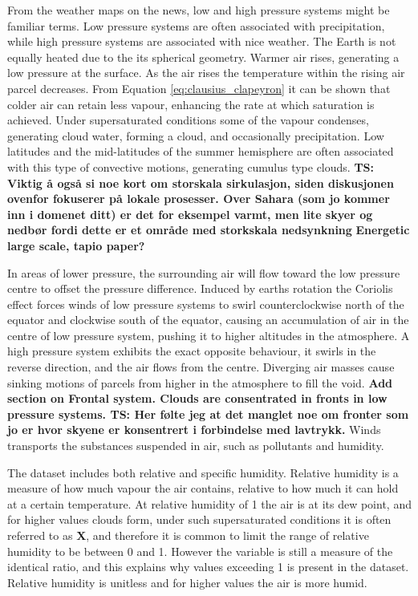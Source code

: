 From the weather maps on the news, low and high pressure systems might be familiar terms. Low pressure systems are often associated with precipitation, while high pressure systems are associated with nice weather. The Earth is not equally heated due to the its spherical geometry. Warmer air rises, generating a low pressure at the surface. As the air rises the temperature within the rising air parcel decreases. From Equation \eqref{eq:clausius_clapeyron} it can be shown that colder air can retain less vapour, enhancing the rate at which saturation is achieved. Under supersaturated conditions some of the vapour condenses, generating cloud water, forming a cloud, and occasionally precipitation. Low latitudes and the mid-latitudes of the summer hemisphere are often associated with this type of convective motions, generating cumulus type clouds. \textbf{TS: Viktig å også si noe kort om storskala sirkulasjon, siden diskusjonen ovenfor fokuserer på lokale prosesser. Over Sahara (som jo kommer inn i domenet ditt) er det for eksempel varmt, men lite skyer og nedbør fordi dette er et område med storkskala nedsynkning}
\textbf{Energetic large scale, tapio paper?}

In areas of lower pressure, the surrounding air will flow toward the low pressure centre to offset the pressure difference. Induced by earths rotation the Coriolis effect forces winds of low pressure systems to swirl counterclockwise north of the equator and clockwise south of the equator, causing an accumulation of air in the centre of low pressure system, pushing it to higher altitudes in the atmosphere. A high pressure system exhibits the exact opposite behaviour, it swirls in the reverse direction, and the air flows from the centre. Diverging air masses cause sinking motions of parcels from higher in the atmosphere to fill the void. \textbf{Add section on Frontal system. Clouds are consentrated in fronts in low pressure systems. TS: Her følte jeg at det manglet noe om fronter som jo er hvor skyene er konsentrert i forbindelse med lavtrykk.}
Winds transports the substances suspended in air, such as pollutants and humidity. 

The dataset includes both relative and specific humidity. Relative humidity is a measure of how much vapour the air contains, relative to how much it can hold at a certain temperature. At relative humidity of 1 the air is at its dew point, and for higher values clouds form, under such supersaturated conditions it is often referred to as \textbf{X}, and therefore it is common to limit the range of relative humidity to be between 0 and 1. However the variable is still a measure of the identical ratio, and this explains why values exceeding 1 is present in the dataset. Relative humidity is unitless and for higher values the air is more humid.

